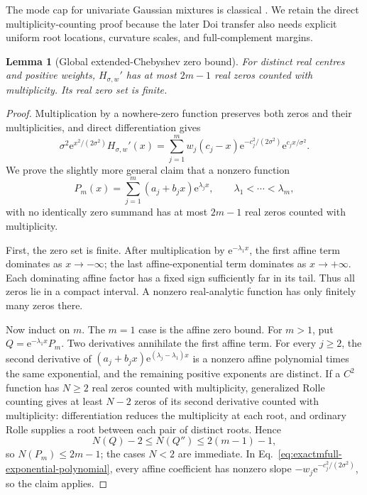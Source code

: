 \documentclass{iopjournal}
\newcommand{\e}{\mathrm e}
\theoremstyle{plain}
\newtheorem{lemma}[theorem]{Lemma}
\theoremstyle{definition}
\begin{document}
The mode cap for univariate Gaussian mixtures is classical
\cite{carreiraPerpinanWilliams2003modes,amendolaEngstromHaase2020modes}.
We retain the direct multiplicity-counting proof because the later Doi
transfer also needs explicit uniform root locations, curvature scales, and
full-complement margins.

\begin{lemma}[Global extended-Chebyshev zero bound]
\label{lem:exactmfull-zero-bound}
For distinct real centres and positive weights,
\(H_{\sigma,w}'\) has at most \(2m-1\) real zeros counted with
multiplicity.  Its real zero set is finite.
\end{lemma}

\begin{proof}
Multiplication by a nowhere-zero function preserves both zeros and their
multiplicities, and direct differentiation gives
\begin{equation}
 \sigma^2\e^{x^2/(2\sigma^2)}H_{\sigma,w}'(x)
 =\sum_{j=1}^m w_j(c_j-x)
   \e^{-c_j^2/(2\sigma^2)}\e^{c_jx/\sigma^2}.
 \label{eq:exactmfull-exponential-polynomial}
\end{equation}
We prove the slightly more general claim that a nonzero function
\begin{equation}
 P_m(x)=\sum_{j=1}^m(a_j+b_jx)\e^{\lambda_jx},
 \qquad \lambda_1<\cdots<\lambda_m,
 \label{eq:exactmfull-general-exp-polynomial}
\end{equation}
with no identically zero summand has at most \(2m-1\) real zeros counted
with multiplicity.

First, the zero set is finite.  After multiplication by
\(\e^{-\lambda_1x}\), the first affine term dominates as \(x\to-\infty\);
the last affine-exponential term dominates as \(x\to+\infty\).  Each
dominating affine factor has a fixed sign sufficiently far in its tail.
Thus all zeros lie in a compact interval.  A nonzero real-analytic function
has only finitely many zeros there.

Now induct on \(m\).  The \(m=1\) case is the affine zero bound.  For
\(m>1\), put \(Q=\e^{-\lambda_1x}P_m\).  Two derivatives annihilate the first
affine term.  For every \(j\ge2\), the second derivative of
\((a_j+b_jx)\e^{(\lambda_j-\lambda_1)x}\) is a nonzero affine polynomial
times the same exponential, and the remaining positive exponents are
distinct.  If a \(C^2\) function has \(N\ge2\) real zeros counted with
multiplicity, generalized Rolle counting gives at least \(N-2\) zeros of
its second derivative counted with multiplicity: differentiation reduces
the multiplicity at each root, and ordinary Rolle supplies a root between
each pair of distinct roots.  Hence
\begin{equation}
 N(Q)-2\le N(Q'')\le2(m-1)-1,
 \label{eq:exactmfull-rolle-count}
\end{equation}
so \(N(P_m)\le2m-1\); the cases \(N<2\) are immediate.  In
Eq.~\eqref{eq:exactmfull-exponential-polynomial}, every affine coefficient
has nonzero slope
\(-w_j\e^{-c_j^2/(2\sigma^2)}\), so the claim applies.
\end{proof}
\end{document}
